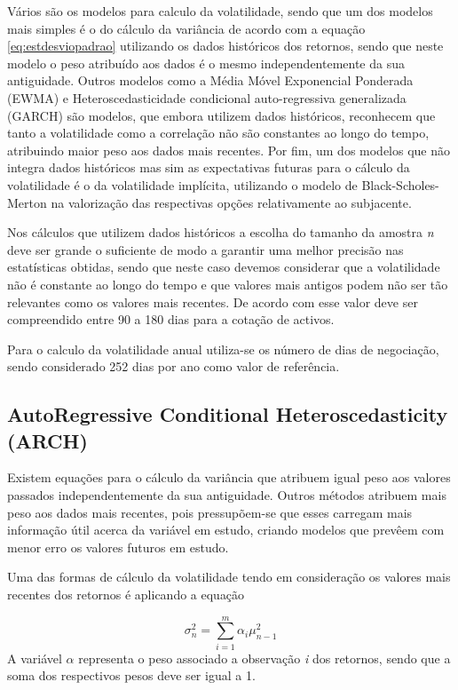 \documentclass[
  12pt,
  a4paper,
  openany]{book}
\begin{document}
Vários são os modelos para calculo da volatilidade, sendo que um dos modelos mais simples é o do cálculo da variância de acordo com a equação \eqref{eq:estdesviopadrao} utilizando os dados históricos dos retornos, sendo que neste modelo o peso atribuído aos dados é o mesmo independentemente da sua antiguidade. Outros modelos como a Média Móvel Exponencial Ponderada (EWMA) e Heteroscedasticidade condicional auto-regressiva generalizada (GARCH) são modelos, que embora utilizem dados históricos, reconhecem que tanto a volatilidade como a correlação não são constantes ao longo do tempo, atribuindo maior peso aos dados mais recentes. Por fim, um dos modelos que não integra dados históricos mas sim as expectativas futuras para o cálculo da volatilidade é o da volatilidade implícita, utilizando o modelo de Black-Scholes-Merton na valorização das respectivas opções relativamente ao subjacente.

Nos cálculos que utilizem dados históricos a escolha do tamanho da amostra \emph{n} deve ser grande o suficiente de modo a garantir uma melhor precisão nas estatísticas obtidas, sendo que neste caso devemos considerar que a volatilidade não é constante ao longo do tempo e que valores mais antigos podem não ser tão relevantes como os valores mais recentes. De acordo com \citep{Hull2018} esse valor deve ser compreendido entre 90 a 180 dias para a cotação de activos.

Para o calculo da volatilidade anual utiliza-se os número de dias de negociação, sendo considerado 252 dias por ano como valor de referência.

\hypertarget{autoregressive-conditional-heteroscedasticity-arch}{%
\subsection{AutoRegressive Conditional Heteroscedasticity (ARCH)}\label{autoregressive-conditional-heteroscedasticity-arch}}

Existem equações para o cálculo da variância que atribuem igual peso aos valores passados independentemente da sua antiguidade. Outros métodos atribuem mais peso aos dados mais recentes, pois pressupõem-se que esses carregam mais informação útil acerca da variável em estudo, criando modelos que prevêem com menor erro os valores futuros em estudo.

Uma das formas de cálculo da volatilidade tendo em consideração os valores mais recentes dos retornos é aplicando a equação

\begin{equation} 
  \sigma_{n}^{2} =\sum_{i=1}^{m}\alpha_i\mu_{n-1}^{2}
  \label{eq:weight}
\end{equation}
A variável \(\alpha\) representa o peso associado a observação \emph{i} dos retornos, sendo que a soma dos respectivos pesos deve ser igual a 1.
\end{document}
